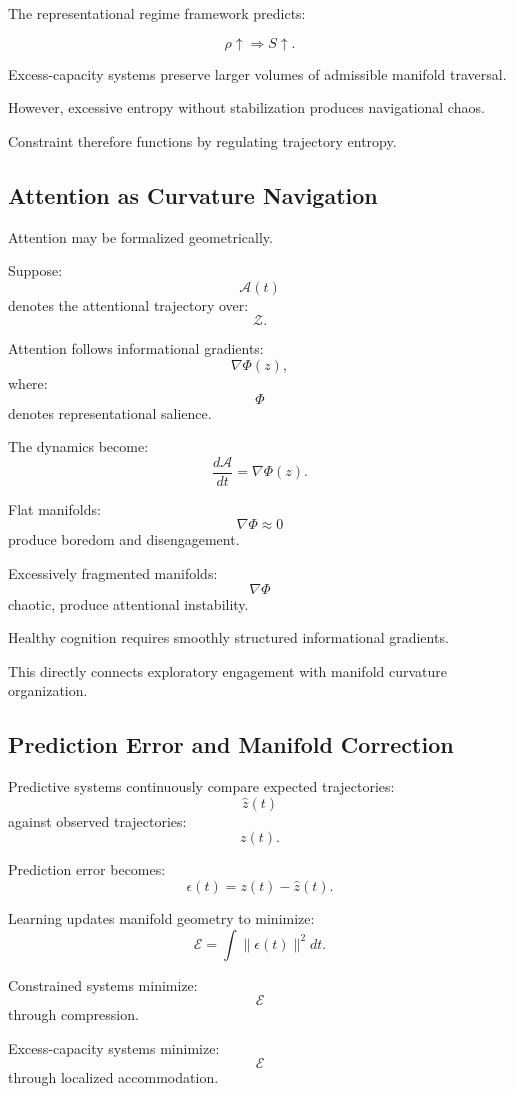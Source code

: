 \documentclass[12pt,a4paper]{article}
\begin{document}
The representational regime framework predicts:

\[
\rho
\uparrow
\Rightarrow
S
\uparrow.
\]

Excess-capacity systems preserve larger volumes of admissible manifold traversal.

However, excessive entropy without stabilization produces navigational chaos.

Constraint therefore functions by regulating trajectory entropy.

\subsection{Attention as Curvature Navigation}

Attention may be formalized geometrically.

Suppose:
\[
\mathcal{A}(t)
\]
denotes the attentional trajectory over:
\[
\mathcal{Z}.
\]

Attention follows informational gradients:
\[
\nabla \Phi(z),
\]
where:
\[
\Phi
\]
denotes representational salience.

The dynamics become:
\[
\frac{d\mathcal{A}}{dt}
=
\nabla \Phi(z).
\]

Flat manifolds:
\[
\nabla \Phi
\approx
0
\]
produce boredom and disengagement.

Excessively fragmented manifolds:
\[
\nabla \Phi
\]
chaotic,
produce attentional instability.

Healthy cognition requires smoothly structured informational gradients.

This directly connects exploratory engagement with manifold curvature organization.

\subsection{Prediction Error and Manifold Correction}

Predictive systems continuously compare expected trajectories:
\[
\hat{z}(t)
\]
against observed trajectories:
\[
z(t).
\]

Prediction error becomes:
\[
\epsilon(t)
=
z(t)-\hat{z}(t).
\]

Learning updates manifold geometry to minimize:
\[
\mathcal{E}
=
\int
\|\epsilon(t)\|^2
dt.
\]

Constrained systems minimize:
\[
\mathcal{E}
\]
through compression.

Excess-capacity systems minimize:
\[
\mathcal{E}
\]
through localized accommodation.
\end{document}
